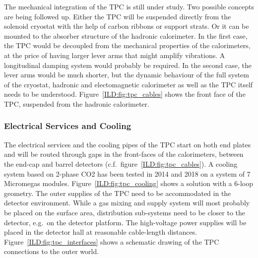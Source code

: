 The mechanical integration of the TPC is still under study. Two possible concepts are being followed up. Either the TPC will be suspended directly from the solenoid cryostat with the help of carbon ribbons or support strats. Or it can be mounted to the absorber structure of the hadronic calorimeter. In the first case, the TPC would be decoupled from the mechanical properties of the calorimeters, at the price of having larger lever arms that might amplify vibrations. A longitudinal damping system would probably be required. In the second case, the lever arms would be much shorter, but the dynamic behaviour of the full system of the cryostat, hadronic and electomagnetic calorimeter as well as the TPC itself needs to be understood. Figure~\ref{ILD:fig:tpc_cables} shows the front face of the TPC, suspended from the hadronic calorimeter.

\subsubsection{Electrical Services and Cooling}

The electrical services and the cooling pipes of the TPC start on both end plates and will be routed through gaps in the front-faces of the calorimeters, between the end-cap and barrel detectors (c.f.~figure~\ref{ILD:fig:tpc_cables}). A cooling system based on 2-phase CO2 has been tested in 2014 and 2018 on a system of
7 Micromegas modules. Figure~\ref{ILD:fig:tpc_cooling} shows a solution with a 6-loop geometry. The outer supplies of the TPC need to be accommodated in the detector environment. While a gas mixing and supply system will most probably be placed on the surface area, distribution sub-systems need to be closer to the detector, e.g.~on the detector platform. The high-voltage power supplies will be placed in the detector hall at reasonable cable-length distances. Figure~\ref{ILD:fig:tpc_interfaces} shows a schematic drawing of the TPC connections to the outer world.

